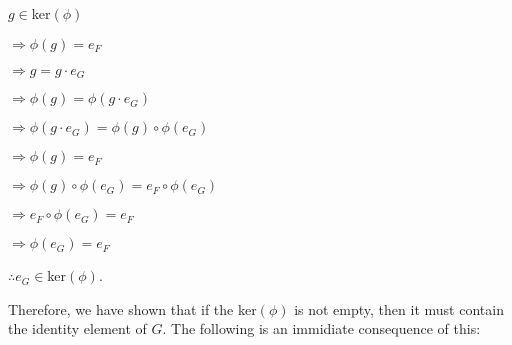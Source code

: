 \documentclass[12pt, a4paper]{article}
\begin{document}
\newpage

\hspace{2mm} $g\in$ker$(\phi)$\par
\vspace{2mm}
\hspace{10mm} $\Rightarrow\phi(g)=e_F$\par
\vspace{2mm}
\hspace{10mm} $\Rightarrow g=g\cdot e_G$\par
\vspace{2mm}
\hspace{10mm} $\Rightarrow\phi(g)=\phi(g\cdot e_G)$\par
\vspace{2mm}
\hspace{10mm} $\Rightarrow \phi(g\cdot e_G)=\phi(g)\circ\phi(e_G)$\par
\vspace{2mm}
\hspace{10mm} $\Rightarrow\phi(g)=e_F$\par
\vspace{2mm}
\hspace{10mm} $\Rightarrow\phi(g)\circ\phi(e_G)=e_F\circ\phi(e_G)$\par
\vspace{2mm}
\hspace{10mm} $\Rightarrow e_F\circ\phi(e_G)=e_F$\par
\vspace{2mm}
\hspace{10mm} $\Rightarrow\phi(e_G)=e_F$\par
\vspace{2mm}
\hspace{2mm} $\therefore e_G\in$ker$(\phi)$.\par
\vspace{4mm}

    Therefore, we have shown that if the ker$(\phi)$ is not empty, then it must contain the identity element of $G$. The following is an immidiate consequence of this:\par
    
\vspace{4mm}
\end{document}

